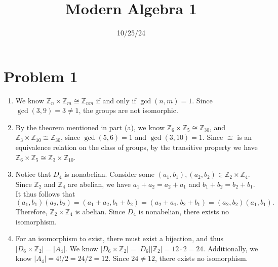 \documentclass[11pt, letterpaper]{report}
\title{Modern Algebra 1}
\date{10/25/24}
\begin{document}
\makeproblem
\section*{Problem 1}
\begin{solution}
	\begin{enumerate}[label=(\alph*)]
		\item We know $\mathbb{Z}_n\times \mathbb{Z}_m\cong \mathbb{Z}_{nm}$ if and only if $\operatorname{gcd}(n,m) =1$. Since $\operatorname{gcd}(3,9) =3\neq 1$, the groups are not isomorphic.
		\item By the theorem mentioned in part (a), we know $\mathbb{Z}_6\times \mathbb{Z}_5\cong \mathbb{Z}_{30}$, and $\mathbb{Z}_3\times \mathbb{Z}_{10}\cong \mathbb{Z}_{30}$, since $\operatorname{gcd}(5,6) =1$ and $\operatorname{gcd}(3,10) =1$. Since $\cong $ is an equivalence relation on the class of groups, by the transitive property we have $\mathbb{Z}_6\times \mathbb{Z}_5\cong \mathbb{Z}_3\times \mathbb{Z}_{10}$.
		\item Notice that $D_4$ is nonabelian. Consider some $(a_1,b_1),(a_2,b_2)\in \mathbb{Z}_2\times \mathbb{Z}_4$. Since $\mathbb{Z}_2$ and $\mathbb{Z}_4$ are abelian, we have $a_1 + a_2 = a_2 + a_1$ and $b_1 + b_2=b_2+b_1$. It thus follows that 
			\[
				(a_1,b_1)(a_2,b_2)=(a_1+a_2,b_1+b_2)=(a_2+a_1,b_2+b_1)=(a_2,b_2)(a_1,b_1)
			.\]
			Therefore, $\mathbb{Z}_2\times \mathbb{Z}_4$ is abelian. Since $D_4$ is nonabelian, there exists no isomorphism.
		\item For an isomorphism to exist, there must exist a bijection, and thus $\left| D_6\times \mathbb{Z}_2\right| =\left| A_4 \right| $. We know $\left| D_6 \times \mathbb{Z}_2 \right| =\left| D_6 \right| \left| \mathbb{Z}_2 \right| = 12\cdot 2=24$. Additionally, we know $\left| A_4 \right| =4!/2 = 24/2=12$. Since $24\neq 12$, there exists no isomorphism.
	\end{enumerate}
\end{solution}
\end{document}
